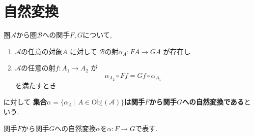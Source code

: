\section{自然変換}
\begin{Def}
圏$\mathscr{A}$から圏$\mathscr{B}$への関手$F,G$について,
\begin{enumerate}
\item $\mathscr{A}$の任意の対象$A$ 
に対して
$\mathscr{B}$の射$\alpha_A:FA\rightarrow GA$
が存在し
\item $\mathscr{A}$の任意の射$f:A_1\rightarrow A_2$
が
\[
\alpha_{A_2}\circ Ff
=Gf\circ\alpha_{A_1}
\]
を満たすとき
\end{enumerate}に対して
{\bf 集合$\alpha=\{\alpha_A\mid A\in\mathrm{Obj}(\mathscr{A})\}$は関手$F$から関手$G$への自然変換である}という.
\end{Def}
\begin{Notation}
関手$F$から関手$G$への自然変換$\alpha$を$\alpha:F\rightarrow G$で表す.
\end{Notation}
\begin{comment}
\begin{Notation}
関手$F$から関手$G$への自然変換$\alpha$を次の図表で表す.
\end{Notation}
\end{comment}
\begin{comment}
\section{Haskにおける自然変換}
\subsection{concat}
\subsection{List関手からMaybe関手への自然変換safehead}
\subsection{concatとsafeheadの垂直合成}
\subsection{二分木からリストへのflatten関数}

\section{Haskにおける定数関手}
\subsection{length関数}
\end{comment}
